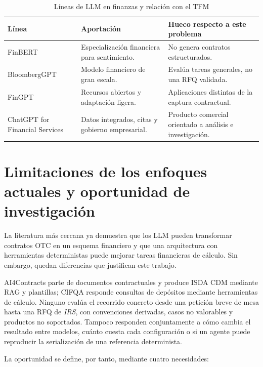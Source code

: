 \begin{table}[H]
\centering
\small
\caption{Líneas de LLM en finanzas y relación con el TFM}
\label{tab:evolucion_llm_finanzas}
\begin{tabular}{|P{3.0cm}|P{4.3cm}|P{5.5cm}|}
\hline
\textbf{Línea} & \textbf{Aportación} & \textbf{Hueco respecto a este problema} \\
\hline
FinBERT & Especialización financiera para sentimiento. & No genera contratos estructurados. \\
\hline
BloombergGPT & Modelo financiero de gran escala. & Evalúa tareas generales, no una RFQ validada. \\
\hline
FinGPT & Recursos abiertos y adaptación ligera. & Aplicaciones distintas de la captura contractual. \\
\hline
ChatGPT for Financial Services & Datos integrados, citas y gobierno empresarial. & Producto comercial orientado a análisis e investigación. \\
\hline
\end{tabular}
\end{table}

\section{Limitaciones de los enfoques actuales y oportunidad de investigación}
\label{sec:oportunidad_investigacion}

La literatura más cercana ya demuestra que los LLM pueden transformar contratos OTC en un esquema financiero y que una arquitectura con herramientas deterministas puede mejorar tareas financieras de cálculo. Sin embargo, quedan diferencias que justifican este trabajo.

AI4Contracts parte de documentos contractuales y produce ISDA CDM mediante RAG y plantillas; CIFQA responde consultas de depósitos mediante herramientas de cálculo. Ninguno evalúa el recorrido concreto desde una petición breve de mesa hasta una RFQ de \textit{IRS}, con convenciones derivadas, casos no valorables y productos no soportados. Tampoco responden conjuntamente a cómo cambia el resultado entre modelos, cuánto cuesta cada configuración o si un agente puede reproducir la serialización de una referencia determinista.

La oportunidad se define, por tanto, mediante cuatro necesidades:

